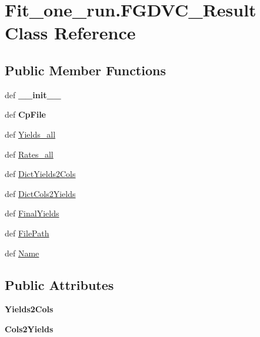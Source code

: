 \hypertarget{classFit__one__run_1_1FGDVC__Result}{\section{\-Fit\-\_\-one\-\_\-run.\-F\-G\-D\-V\-C\-\_\-\-Result \-Class \-Reference}
\label{classFit__one__run_1_1FGDVC__Result}
}
\subsection*{\-Public \-Member \-Functions}
\begin{DoxyCompactItemize}
\item 
\hypertarget{classFit__one__run_1_1FGDVC__Result_a11dacf28455be253b4e60b327485cdf6}{def {\bfseries \-\_\-\-\_\-init\-\_\-\-\_\-}}\label{classFit__one__run_1_1FGDVC__Result_a11dacf28455be253b4e60b327485cdf6}

\item 
\hypertarget{classFit__one__run_1_1FGDVC__Result_a4479af6c802cad3f8fb46bca63f84ecd}{def {\bfseries \-Cp\-File}}\label{classFit__one__run_1_1FGDVC__Result_a4479af6c802cad3f8fb46bca63f84ecd}

\item 
def \hyperlink{classFit__one__run_1_1FGDVC__Result_a51c9e1c4fc8972b8d3bc6991e5cfc6d7}{\-Yields\-\_\-all}
\item 
def \hyperlink{classFit__one__run_1_1FGDVC__Result_a75e1d1193dc0a8516ef862e3058fc40b}{\-Rates\-\_\-all}
\item 
def \hyperlink{classFit__one__run_1_1FGDVC__Result_a976055f75464152c70c6dce9ce495999}{\-Dict\-Yields2\-Cols}
\item 
def \hyperlink{classFit__one__run_1_1FGDVC__Result_ae0f7cb9ad37b1a0e26ad39d92c3ec5ab}{\-Dict\-Cols2\-Yields}
\item 
def \hyperlink{classFit__one__run_1_1FGDVC__Result_a2de0fb53036b5fa2cc5bba3994470f20}{\-Final\-Yields}
\item 
def \hyperlink{classFit__one__run_1_1FGDVC__Result_a7d4b878125eb73bbffcb3c0a78b8415e}{\-File\-Path}
\item 
def \hyperlink{classFit__one__run_1_1FGDVC__Result_a0976c4171cc359ef64ac723cbf72977e}{\-Name}
\end{DoxyCompactItemize}
\subsection*{\-Public \-Attributes}
\begin{DoxyCompactItemize}
\item 
\hypertarget{classFit__one__run_1_1FGDVC__Result_a25579928e9bd5d60f3fe16784a813131}{{\bfseries \-Yields2\-Cols}}\label{classFit__one__run_1_1FGDVC__Result_a25579928e9bd5d60f3fe16784a813131}

\item 
\hypertarget{classFit__one__run_1_1FGDVC__Result_ae9b8ef85f1a5682c9befeb020b6f88b2}{{\bfseries \-Cols2\-Yields}}\label{classFit__one__run_1_1FGDVC__Result_ae9b8ef85f1a5682c9befeb020b6f88b2}

\end{DoxyCompactItemize}


